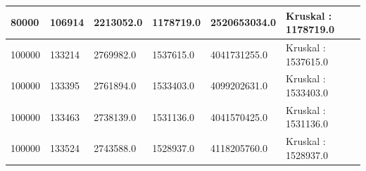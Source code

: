 \begin{longtable}[H]{|p{1.5cm}|p{1.5cm}|p{2cm}|p{2cm}|p{3cm}|p{3cm}|}
    80000 & 106914 & 2213052.0 & 1178719.0 & 2520653034.0 & Kruskal : 1178719.0 \\ \hline
    100000 & 133214 & 2769982.0 & 1537615.0 & 4041731255.0 & Kruskal : 1537615.0 \\ \hline 
    100000 & 133395 & 2761894.0 & 1533403.0 & 4099202631.0 & Kruskal : 1533403.0 \\ \hline 
    100000 & 133463 & 2738139.0 & 1531136.0 & 4041570425.0 & Kruskal : 1531136.0 \\ \hline 
    100000 & 133524 & 2743588.0 & 1528937.0 & 4118205760.0 & Kruskal : 1528937.0 \\ \hline 
\end{longtable}










